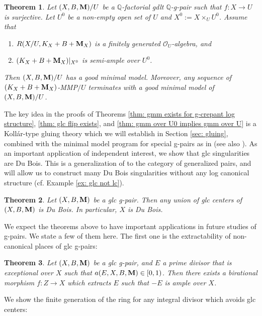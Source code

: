 \documentclass[11pt]{amsart}
\numberwithin{equation}{section}
\newcommand{\Mm}{{\bf{M}}}
\newcommand{\Qq}{\mathbb{Q}}
\newcommand{\Oo}{\mathcal{O}}
\newtheorem{thm}{Theorem}[section]
\theoremstyle{definition}
\theoremstyle{definition}
\theoremstyle{definition}
\begin{document}
\begin{thm}\label{thm: finite generation imply semi-ample}
Let $(X,B,\Mm)/U$ be a $\Qq$-factorial gdlt $\Qq$-g-pair such that $f: X\to U$ is surjective. Let $U^0$ be a non-empty open set of $U$ and $X^0:=X\times_U U^0$. Assume that 
\begin{enumerate}
    \item $R(X/U,K_X+B+\Mm_X)$ is a finitely
generated $\Oo_U$-algebra, and
\item $(K_X+B+\Mm_X)|_{X^0}$ is semi-ample over $U^0$.
\end{enumerate}
Then $(X,B,\Mm)/U$ has a good minimal model. Moreover, any sequence of $(K_X+B+\Mm_X)$-MMP$/U$ terminates with a good minimal model of $(X,B,\Mm)/U$.
\end{thm}

The key idea in the proofs of Theorems \ref{thm: gmm exists for g-crepant log structure}, \ref{thm: glc flip exists}, and \ref{thm: gmm over U0 implies gmm over U} is a Koll\'ar-type gluing theory which we will establish in Section \ref{sec: gluing}, combined with the minimal model program for special g-pairs as in \cite{LX22} (see also \cite{Has22}). As an important application of independent interest, we show that glc singularities are Du Bois. This is a generalization of \cite[Theorem 1.4]{KK10} to the category of generalized pairs, and will allow us to construct many Du Bois singularities without any log canonical structure (cf. Example \ref{ex: glc not lc}).

\begin{thm}\label{thm: glc sings are Du Bois}
Let $(X,B,\Mm)$ be a glc g-pair. Then any union of glc centers of $(X,B,\Mm)$ is Du Bois. In particular, $X$ is Du Bois.
\end{thm}


We expect the theorems above to have important applications in future studies of g-pairs. We state a few of them here. The first one is the extractability of non-canonical places of glc g-pairs:

\begin{thm}\label{thm: extracting divisor over glc structure}
Let $(X,B,\Mm)$ be a glc g-pair, and $E$ a prime divisor that is exceptional over $X$ such that $a(E,X,B,\Mm)\in [0,1)$. Then there exists a birational morphism $f: Z\to X$ which extracts $E$ such that $-E$ is ample over $X$.
\end{thm}

We show the finite generation of the ring for any integral divisor which avoids glc centers:
\end{document}
